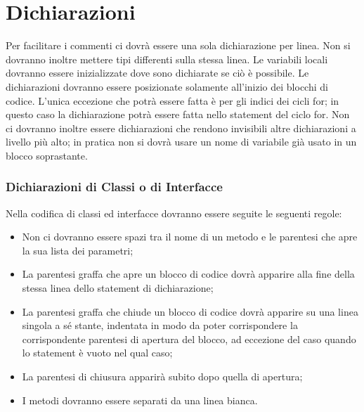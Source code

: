 \documentclass[11pt,titlepage,a4paper]{report}
\begin{document}
\chapter{Dichiarazioni}
Per facilitare i commenti ci dovr\`a essere una sola dichiarazione per linea. Non si dovranno inoltre mettere tipi differenti sulla stessa linea. Le variabili locali dovranno essere inizializzate dove sono dichiarate se ci\`o \`e possibile. Le dichiarazioni dovranno essere posizionate solamente all'inizio dei blocchi di codice. L'unica eccezione che potr\`a essere fatta è per gli indici dei cicli for; in questo caso la dichiarazione potr\`a essere fatta nello statement del ciclo for. Non ci dovranno inoltre essere dichiarazioni che rendono invisibili altre dichiarazioni a livello più alto; in pratica non si dovr\`a usare un nome di variabile già usato in un blocco soprastante.
\subsection{Dichiarazioni di Classi o di Interfacce}
Nella codifica di classi ed interfacce dovranno essere seguite le seguenti regole:
\begin{itemize}
\item Non ci dovranno essere spazi tra il nome di un metodo e le parentesi che apre la sua lista dei parametri;
\item La parentesi graffa che apre un blocco di codice dovr\`a apparire alla fine della stessa linea dello statement di dichiarazione;
\item La parentesi graffa che chiude un blocco di codice dovr\`a apparire su una linea singola a sé stante, indentata in modo da poter corrispondere la corrispondente parentesi di apertura del blocco, ad eccezione del caso quando lo statement è vuoto nel qual caso;
\item La parentesi di chiusura apparir\`a subito dopo quella di apertura;
\item I metodi dovranno essere separati da una linea bianca.
\end{itemize}
\end{document}
